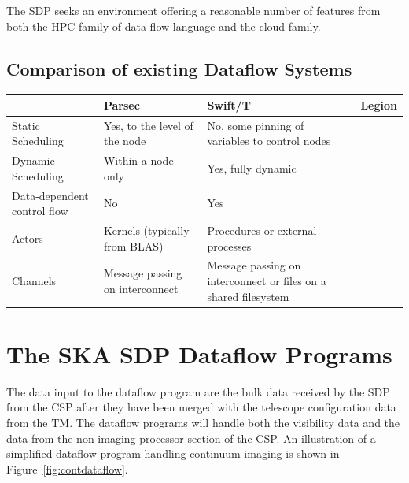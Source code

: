 \documentclass[11pt,a4paper]{article}
\begin{document}
The SDP seeks an environment offering a reasonable number of features
from both the HPC family of data flow language and the cloud family.

\subsection{Comparison of  existing Dataflow Systems}

\begin{table}[h]
\centering
\begin{tabular}{|p{}|p{}|p{}|p{}|}
 \hline
& Parsec & Swift/T & Legion\\\hline
Static Scheduling &
Yes, to the level of the node &
No, some pinning of variables to control nodes 
&\\\hline
Dynamic Scheduling &
Within a node only&
Yes, fully dynamic&\\\hline
Data-dependent control flow &
No & Yes & \\\hline
Actors & Kernels (typically from BLAS) & Procedures or external processes & \\\hline
Channels &
Message passing on interconnect &
Message passing on interconnect or files on a shared filesystem & \\\hline
\end{tabular}
\end{table}

\section{The SKA SDP Dataflow Programs}
\label{sec:ska-sdp-dataflow}

The data input to the dataflow program are the bulk data received by
the SDP from the CSP after they have been merged with the telescope
configuration data from the TM. The dataflow programs will handle both
the visibility data and the data from the non-imaging processor
section of the CSP. An illustration of a simplified dataflow program
handling continuum imaging is shown in Figure~\ref{fig:contdataflow}.
\end{document}
